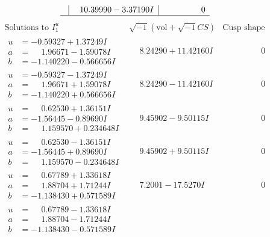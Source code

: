 \documentclass[1p]{elsarticle_modified}
\theoremstyle{definition}
\newcommand{\I}{\sqrt{-1}}
\begin{document}
$$\begin{array}{c|c|c}
 & \phantom{-}10.39990 - 3.37190 I & \phantom{-0.000000 } 0\\
 \hline 
 \end{array}$$\newpage$$\begin{array}{c|c|c}  
\text{Solutions to }I^u_{1}& \I (\text{vol} + \sqrt{-1}CS) & \text{Cusp shape}\\
 \hline 
\begin{aligned}
u &= -0.59327 + 1.37249 I \\
a &= \phantom{-}1.96671 - 1.59078 I \\
b &= -1.140220 - 0.566656 I\end{aligned}
 & \phantom{-}8.24290 + 11.42160 I & \phantom{-0.000000 } 0 \\ \hline\begin{aligned}
u &= -0.59327 - 1.37249 I \\
a &= \phantom{-}1.96671 + 1.59078 I \\
b &= -1.140220 + 0.566656 I\end{aligned}
 & \phantom{-}8.24290 - 11.42160 I & \phantom{-0.000000 } 0 \\ \hline\begin{aligned}
u &= \phantom{-}0.62530 + 1.36151 I \\
a &= -1.56445 - 0.89690 I \\
b &= \phantom{-}1.159570 + 0.234648 I\end{aligned}
 & \phantom{-}9.45902 - 9.50115 I & \phantom{-0.000000 } 0 \\ \hline\begin{aligned}
u &= \phantom{-}0.62530 - 1.36151 I \\
a &= -1.56445 + 0.89690 I \\
b &= \phantom{-}1.159570 - 0.234648 I\end{aligned}
 & \phantom{-}9.45902 + 9.50115 I & \phantom{-0.000000 } 0 \\ \hline\begin{aligned}
u &= \phantom{-}0.67789 + 1.33618 I \\
a &= \phantom{-}1.88704 + 1.71244 I \\
b &= -1.138430 + 0.571589 I\end{aligned}
 & \phantom{-}7.2001 - 17.5270 I & \phantom{-0.000000 } 0 \\ \hline\begin{aligned}
u &= \phantom{-}0.67789 - 1.33618 I \\
a &= \phantom{-}1.88704 - 1.71244 I \\
b &= -1.138430 - 0.571589 I\end{aligned}

\end{array}$$
\end{document}
